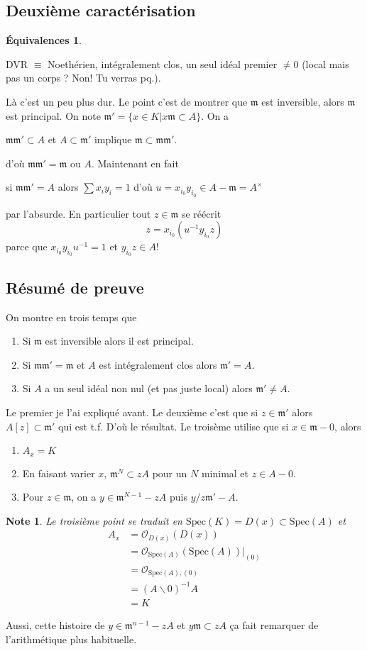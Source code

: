 \documentclass[a4paper,12pt]{book}
\newcommand{\Or}{\mathcal{O}}
\newcommand{\m}{\mathfrak m}
\newcommand{\Spec}{\textrm{Spec}}
\theoremstyle{plain}
\newtheorem{note}{Note}
\theoremstyle{definition}
\newtheorem*{eq}{Équivalences}
\theoremstyle{remark}
\begin{document}
\subsection{Deuxième caractérisation}
\begin{eq}
    \begin{center}
	DVR $\equiv$ Noethérien, intégralement clos, un seul idéal
	premier $\ne 0$ (local mais pas un corps ? Non! Tu
	verras pq.).
    \end{center}
\end{eq}
Là c'est un peu plus dur. Le point c'est de montrer que $\m$ est 
inversible, alors $\m$ est principal. On note 
$\m'=\{x\in K|x\m\subset A\}$. On a 
\begin{center}
    $\m\m'\subset A$ et $A\subset \m'$ implique 
    $\m\subset \m\m'$.
\end{center}
d'où $\m\m'=\m$ ou $A$. Maintenant en fait
\begin{center}
    si $\m\m'=A$ alors $\sum x_iy_i=1$ d'où 
    $u=x_{i_0}y_{i_0}\in A-\m=A^{\times}$ 
\end{center}
par l'absurde. En particulier tout $z\in\m$ se réécrit 
\[z=x_{i_0}(u^{-1}y_{i_0}z)\]
parce que $x_{i_0}y_{i_0}u^{-1}=1$ et $y_{i_0}z\in A$!

\subsection{Résumé de preuve}
On montre en trois temps que 
\begin{enumerate}
    \item Si $\m$ est inversible alors il est principal.
    \item Si $\m\m'=\m$ et $A$ est intégralement clos alors
	$\m'=A$.
    \item Si $A$ a un seul idéal non nul (et pas juste local)
	alors $\m'\ne A$.
\end{enumerate}
Le premier je l'ai expliqué avant. Le deuxième c'est que 
si $z\in \m'$ alors $A[z]\subset \m'$ qui est t.f. D'où le 
résultat. Le troisème utilise que si $x\in \m-0$, alors 
\begin{enumerate}
    \item $A_x=K$
    \item En faisant varier $x$, $\m^N\subset zA$ pour un $N$
	minimal et $z\in A-0$.
    \item Pour $z\in \m$, on a $y\in \m^{N-1}-zA$ puis $y/z\m'-A$.
\end{enumerate}
\begin{note}
Le troisième point se traduit en $\Spec(K)=D(x)\subset \Spec(A)$ et
    \begin{align*}
    A_x&=\Or_{D(x)}(D(x))\\
       &=\Or_{\Spec(A)}(\Spec(A))|_{(0)}\\
       &=\Or_{\Spec(A),(0)}\\
       &= (A\backslash 0)^{-1}A\\
       &=K
    \end{align*}
\end{note}
Aussi, cette histoire de $y\in \m^{n-1}-zA$ et $y\m\subset zA$
ça fait remarquer de l'arithmétique plus habituelle.
\end{document}
